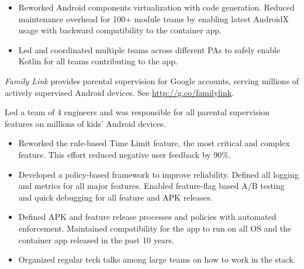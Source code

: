 \documentclass[]{friggeri-cv}
\begin{document}
\begin{entrylist}
{    \begin{itemize}
      \item Reworked Android components virtualization with code generation.
      Reduced maintenance overhead for 100+ module teams by enabling
      latest AndroidX usage with backward compatibility to the container app.
      \item Led and coordinated multiple teams across different PAs to
      safely enable Kotlin for all teams contributing to the app.
    \end{itemize}

    \emph{Family Link} provides parental supervision for Google accounts,
    serving millions of actively supervised Android devices.
    See \url{http://g.co/familylink}.

    Led a team of 4 engineers and was responsible for all parental supervision features on millions of kids' Android devices.

    \begin{itemize}
      \item Reworked the rule-based Time Limit feature, the most critical and complex feature.
      This effort reduced negative user feedback by 90\%.
      \item Developed a policy-based framework to improve reliability.
      Defined all logging and metrics for all major features.
      Enabled feature-flag based A/B testing and quick debugging for all feature and APK releases.
      \item Defined APK and feature release processes and policies with automated enforcement.
      Maintained compatibility for the app to run on all OS and the container app released in the past 10 years.
      \item Organized regular tech talks among large teams on how to work in the stack.
    \end{itemize}
  }
\end{entrylist}
\end{document}
